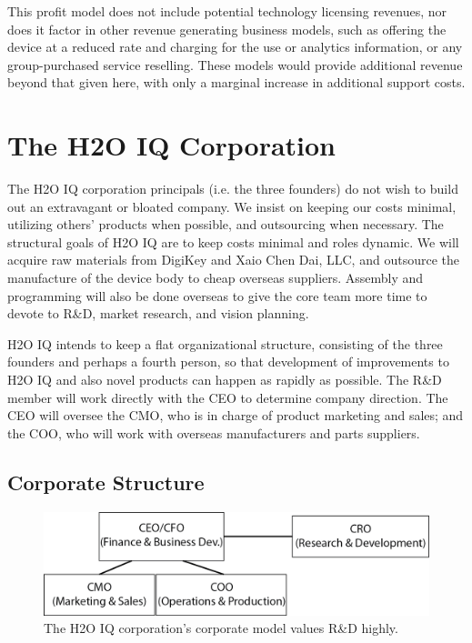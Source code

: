 \documentclass[11pt]{article}
\begin{document}
This profit model does not include potential technology licensing revenues, nor does it factor in other revenue generating business models, such as offering the device at a reduced rate and charging for the use or analytics information, or any group-purchased service reselling. These models would provide additional revenue beyond that given here, with only a marginal increase in additional support costs.

\section{The H2O IQ Corporation}

The H2O IQ corporation principals (i.e. the three founders) do not wish to build out an extravagant or bloated company.  We insist on keeping our costs minimal, utilizing others' products when possible, and outsourcing when necessary.  The structural goals of H2O IQ are to keep costs minimal and roles dynamic.  We will acquire raw materials from DigiKey and Xaio Chen Dai, LLC, and outsource the manufacture of the device body to cheap overseas suppliers.  Assembly and programming will also be done overseas to give the core team more time to devote to R\&D, market research, and vision planning.

H2O IQ intends to keep a flat organizational structure, consisting of the three founders and perhaps a fourth person, so that development of improvements to H2O IQ and also novel products can happen as rapidly as possible.  The R\&D member will work directly with the CEO to determine company direction.  The CEO will oversee the CMO, who is in charge of product marketing and sales; and the COO, who will work with overseas manufacturers and parts suppliers.

\subsection{Corporate Structure}
\begin{figure}[h!]
\begin{center}
\includegraphics[width=5.5in]{./pngs/organizational-model.png}
\end{center}
\caption{The H2O IQ corporation's corporate model values R\&D highly.}
\label{fig:structure}
\end{figure}
\end{document}
